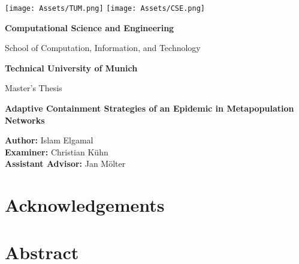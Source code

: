 
% 
\begin{titlepage}
    \centering
    \vspace*{1cm}
    
    \texttt{[image: Assets/TUM.png]}
    \hspace{.5cm}
    \texttt{[image: Assets/CSE.png]}
    
    \vspace{.25cm}
    \LARGE
    \textbf{Computational Science and Engineering}
    
    \vspace{.5cm}
    \Large
    School of Computation, Information, and Technology
    
    \vspace{1.5cm}
    
    \textbf{Technical University of Munich}
    
    \vspace{2cm}
    
    \Large
    Master's Thesis
    
    \vspace{0.5cm}
    
    \textbf{Adaptive Containment Strategies of an Epidemic in Metapopulation Networks}
    
    \vspace{2cm}
    
    \Large
    \textbf{Author:}    Islam Elgamal\\
    \textbf{Examiner:}    Christian Kühn\\
    \textbf{Assistant Advisor:}    Jan Mölter

    \vspace{2cm}
    
    
\end{titlepage}
\newpage

\section*{Acknowledgements}

\newpage


\section*{Abstract}

